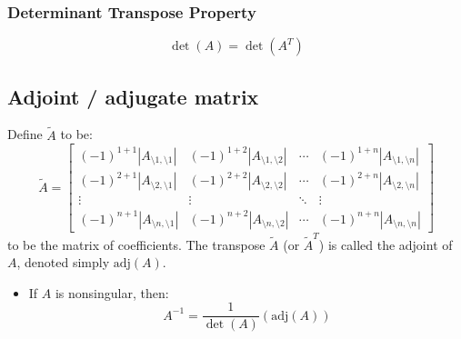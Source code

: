 \documentclass[10pt]{article}
\begin{document}
\subsubsection*{Determinant Transpose Property}
\[\det(A) = \det(A^T)\]

\subsection*{Adjoint / adjugate matrix}
Define $\tilde{A}$ to be:
\[\tilde{A} = \begin{bmatrix}
(-1)^{1 + 1} |A_{\setminus 1, \setminus 1}| & (-1)^{1 + 2} |A_{\setminus 1, \setminus 2}| & \cdots & (-1)^{1 + n} |A_{\setminus 1, \setminus n}| \\
(-1)^{2 + 1} |A_{\setminus 2, \setminus 1}| & (-1)^{2 + 2} |A_{\setminus 2, \setminus 2}| & \cdots & (-1)^{2 + n} |A_{\setminus 2, \setminus n}| \\
\vdots & \vdots & \ddots & \vdots \\
(-1)^{n + 1} |A_{\setminus n, \setminus 1}| & (-1)^{n + 2} |A_{\setminus n, \setminus 2}| & \cdots & (-1)^{n + n} |A_{\setminus n, \setminus n}|
\end{bmatrix}\]
to be the matrix of coefficients.  The transpose $\tilde{A}$ (or $\tilde{A}^T$) is called the adjoint of $A$, denoted simply $\text{adj}(A)$.
\begin{itemize}
	\item If $A$ is nonsingular, then:
	\[A^{-1} = \frac{1}{\det(A)}(\text{adj}(A))\]
\end{itemize}
\end{document}
